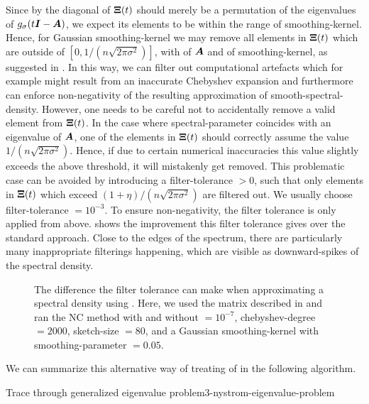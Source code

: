 Since by  the diagonal of $\boldsymbol{\Xi}(t)$
should merely be a permutation of the eigenvalues of $g_{\sigma}(t\boldsymbol{I} - \boldsymbol{A})$,
we expect its elements to be within the range of \gls{smoothing-kernel}. Hence,
for Gaussian \gls{smoothing-kernel} we may remove
all elements in $\boldsymbol{\Xi}(t)$ which are outside of $[0, 1 / (n \sqrt{2 \pi \sigma^2})]$,
with  of $\boldsymbol{A}$ and  of \gls{smoothing-kernel},
as suggested in \cite{lin2017randomized}.
In this way, we can filter out computational artefacts which for example might result
from an inaccurate Chebyshev expansion and furthermore 
can enforce non-negativity of the resulting approximation of
\gls{smooth-spectral-density}. However, one needs to be careful not to accidentally
remove a valid element from $\boldsymbol{\Xi}(t)$. In the case where \gls{spectral-parameter}
coincides with an eigenvalue of $\boldsymbol{A}$, one of the elements in $\boldsymbol{\Xi}(t)$
should correctly assume the value $1 / (n \sqrt{2 \pi \sigma^2})$. Hence, if due to
certain numerical inaccuracies this value slightly exceeds the above threshold,
it will mistakenly get removed. This problematic case can be avoided by introducing a
\gls{filter-tolerance} $>0$, such that only elements in $\boldsymbol{\Xi}(t)$ which
exceed $ (1 + \eta) / (n \sqrt{2 \pi \sigma^2})$ are filtered out. We usually
choose \gls{filter-tolerance} $=10^{-3}$. To ensure
non-negativity, the filter tolerance is only applied from above. 
shows the improvement this filter tolerance gives over the standard approach.
Close to the edges of the spectrum, there are particularly many inappropriate
filterings happening, which are visible as downward-spikes of the spectral density.

\begin{figure}[ht]
    \centering
    
    \caption{The difference the filter tolerance can make when approximating
        a spectral density using . 
        Here, we used the matrix described in 
        and ran the \gls{NC} method with and without  $= 10^{-7}$,
        \gls{chebyshev-degree} $=2000$, \gls{sketch-size} $=80$, and a
        Gaussian \gls{smoothing-kernel} with \gls{smoothing-parameter} $=0.05$.}
    \label{fig:3-nystrom-filter-tolerance}
\end{figure}

We can summarize this alternative way of treating
 of 
in the following algorithm.
\begin{algo}{Trace through generalized eigenvalue problem}{3-nystrom-eigenvalue-problem}
    
\end{algo}

